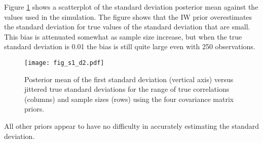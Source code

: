 \documentclass[12pt]{article}
\begin{document}

Figure \ref{devF1} shows a scatterplot of the standard deviation posterior mean against the values used in the simulation. The figure shows that the IW prior overestimates the standard deviation for true values of the standard deviation that are small.  This bias is attenuated somewhat as sample size increase, but when the true standard deviation is 0.01 the bias is still quite large even with 250 observations. 

\begin{figure}[htbp]
\centering
\texttt{[image: fig\_s1\_d2.pdf]} 
\vspace{-.5in}
\caption{Posterior mean of the first standard deviation (vertical axis) versus jittered true standard deviations for the range of true correlations (columns) and sample sizes (rows) using the four covariance matrix priors.}
\label{devF1} 
\end{figure}

All other priors appear to have no difficulty in accurately estimating the standard deviation.  

\end{document}
